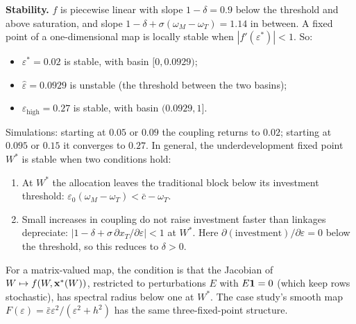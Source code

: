 \documentclass[../solutions_manual.tex]{subfiles}
\begin{document}
 \textbf{Stability.} $f$ is piecewise linear with slope $1 - \delta = 0.9$ below the threshold and above saturation, and slope $1 - \delta + \sigma(\omega_M - \omega_T) = 1.14$ in between. A fixed point of a one-dimensional map is locally stable when $|f'(\varepsilon^*)| < 1$. So:
\begin{itemize}
\item $\varepsilon^* = 0.02$ is stable, with basin $[0, 0.0929)$;
\item $\hat\varepsilon = 0.0929$ is unstable (the threshold between the two basins);
\item $\varepsilon_{\text{high}} = 0.27$ is stable, with basin $(0.0929, 1]$.
\end{itemize}
Simulations: starting at $0.05$ or $0.09$ the coupling returns to $0.02$; starting at $0.095$ or $0.15$ it converges to $0.27$. In general, the underdevelopment fixed point $W^*$ is stable when two conditions hold:
\begin{enumerate}
\item At $W^*$ the allocation leaves the traditional block below its investment threshold: $\varepsilon_0(\omega_M - \omega_T) < \bar c - \omega_T$.
\item Small increases in coupling do not raise investment faster than linkages depreciate: $|1 - \delta + \sigma\,\partial x_T/\partial\varepsilon| < 1$ at $W^*$. Here $\partial(\text{investment})/\partial\varepsilon = 0$ below the threshold, so this reduces to $\delta > 0$.
\end{enumerate}
For a matrix-valued map, the condition is that the Jacobian of $W \mapsto f(W, \mathbf{x}^*(W))$, restricted to perturbations $E$ with $E\mathbf{1} = 0$ (which keep rows stochastic), has spectral radius below one at $W^*$. The case study's smooth map $F(\varepsilon) = \bar\varepsilon\varepsilon^2/(\varepsilon^2 + h^2)$ has the same three-fixed-point structure.
\end{document}
